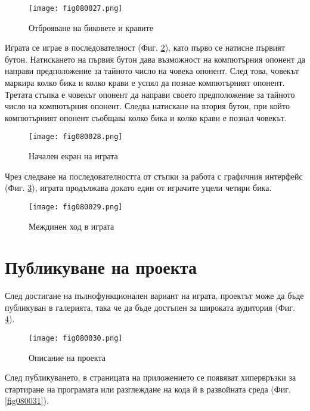 \begin{figure}[H]
  \centering
  \texttt{[image: fig080027.png]}
  \caption{Отброяване на биковете и кравите}
\label{fig080027}
\end{figure}

Играта се играе в последователност (Фиг. \ref{fig080028}), като първо се натисне първият бутон. Натискането на първия бутон дава възможност на компютърния опонент да направи предположение за тайното число на човека опонент. След това, човекът маркира колко бика и колко крави е успял да познае компютърният опонент. Третата стъпка е човекът опонент да направи своето предположение за тайното число на компютърния опонент. Следва натискане на втория бутон, при който компютърният опонент съобщава колко бика и колко крави е познал човекът. 

\begin{figure}[H]
  \centering
  \texttt{[image: fig080028.png]}
  \caption{Начален екран на играта}
\label{fig080028}
\end{figure}

Чрез следване на последователността от стъпки за работа с графичния интерфейс (Фиг. \ref{fig080029}), играта продължава докато един от играчите уцели четири бика.

\begin{figure}[H]
  \centering
  \texttt{[image: fig080029.png]}
  \caption{Междинен ход в играта}
\label{fig080029}
\end{figure}

\section{Публикуване на проекта}

След достигане на пълнофункционален вариант на играта, проектът може да бъде публикуван в галерията, така че да бъде достъпен за широката аудитория (Фиг. \ref{fig080030}).

\begin{figure}[H]
  \centering
  \texttt{[image: fig080030.png]}
  \caption{Описание на проекта}
\label{fig080030}
\end{figure}

След публикуването, в страницата на приложението се появяват хипервръзки за стартиране на програмата или разглеждане на кода й в развойната среда (Фиг. \ref{fig080031}).

